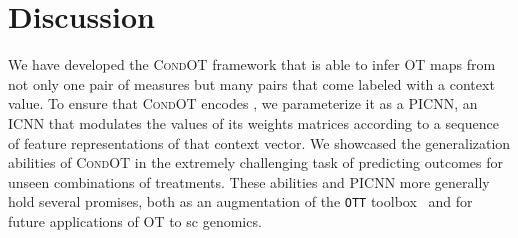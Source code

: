 \section{Discussion}
We have developed the \textsc{CondOT} framework that is able to infer \acrshort{OT} maps from not only one pair of measures but many pairs that come labeled with a context value. To ensure that \textsc{CondOT} encodes , we parameterize it as a \acrshort{PICNN}, an \acrlong{ICNN} that modulates the values of its weights matrices according to a sequence of feature representations of that context vector. We showcased the generalization abilities of \textsc{CondOT} in the extremely challenging task of predicting outcomes for unseen combinations of treatments. These abilities and \acrshort{PICNN} more generally hold several promises, both as an augmentation of the \texttt{OTT} toolbox~\citep{cuturi2022optimal} and for future applications of \acrshort{OT} to \acrlong{sc} genomics.
